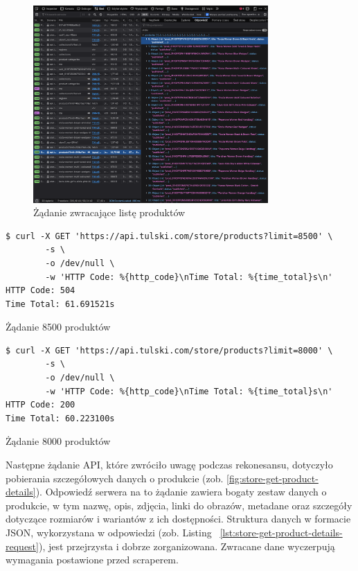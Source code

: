 \begin{figure}[p]
    \centering
    \includegraphics[width=0.8\textwidth]{img/store-get-products-list}
    \caption{Żądanie zwracające listę produktów}
    \label{fig:store-get-products-list}
\end{figure}
\begin{listing}[p]
    \begin{verbatim}
$ curl -X GET 'https://api.tulski.com/store/products?limit=8500' \
        -s \
        -o /dev/null \
        -w 'HTTP Code: %{http_code}\nTime Total: %{time_total}s\n'
HTTP Code: 504
Time Total: 61.691521s
    \end{verbatim}
    \caption{Żądanie 8500 produktów}
    \label{lst:store-get-products-list-8500}
\end{listing}
\begin{listing}[p]
    \begin{verbatim}
$ curl -X GET 'https://api.tulski.com/store/products?limit=8000' \
        -s \
        -o /dev/null \
        -w 'HTTP Code: %{http_code}\nTime Total: %{time_total}s\n'
HTTP Code: 200
Time Total: 60.223100s
    \end{verbatim}
    \caption{Żądanie 8000 produktów}
    \label{lst:store-get-products-list-8000}
\end{listing}

\newpage

Następne żądanie API, które zwróciło uwagę podczas rekonesansu, dotyczyło pobierania szczegółowych danych o produkcie (zob. \autoref{fig:store-get-product-details}).
Odpowiedź serwera na to żądanie zawiera bogaty zestaw danych o produkcie, w tym nazwę, opis, zdjęcia, linki do obrazów, metadane oraz szczegóły dotyczące rozmiarów i wariantów z ich dostępności.
Struktura danych w formacie JSON, wykorzystana w odpowiedzi (zob. Listing ~\autoref{lst:store-get-product-details-request}), jest przejrzysta i dobrze zorganizowana.
Zwracane dane wyczerpują wymagania postawione przed scraperem.

